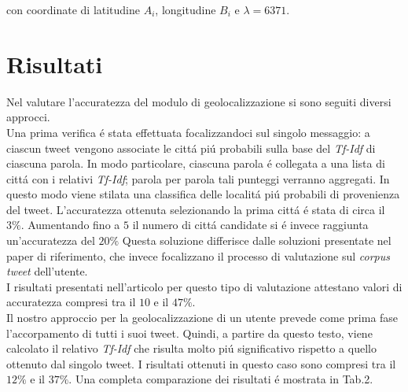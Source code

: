 \documentclass[twocolumn,10pt]{asme2ej}
\begin{document}
con coordinate di latitudine $A_i$, longitudine $B_i$ e $\lambda=6371$. 

\section{Risultati}

Nel valutare l'accuratezza del modulo di geolocalizzazione si sono seguiti diversi approcci. \\Una prima verifica \'e stata effettuata focalizzandoci sul singolo messaggio: a ciascun tweet vengono associate le citt\'a pi\'u probabili sulla base del \textit{Tf-Idf} di ciascuna parola. In modo particolare, ciascuna parola \'e collegata a una lista di citt\'a con i relativi \textit{Tf-Idf}; parola per parola tali punteggi verranno aggregati. In questo modo viene stilata una classifica delle localit\'a pi\'u probabili di provenienza del tweet. L'accuratezza ottenuta selezionando la prima citt\'a \'e stata di circa il $3\%$. Aumentando fino a $5$ il numero di citt\'a candidate si \'e invece raggiunta un'accuratezza del $20\%$ Questa soluzione differisce dalle soluzioni presentate nel paper di riferimento, che invece focalizzano il processo di valutazione sul \textit{corpus tweet} dell'utente. \\I risultati presentati nell'articolo per questo tipo di valutazione attestano   
valori di accuratezza compresi tra il $10$ e il $47\%$.  \\Il nostro approccio per la geolocalizzazione di un utente prevede come prima fase l'accorpamento di tutti i suoi tweet. Quindi, a partire da questo testo, viene calcolato il relativo \textit{Tf-Idf} che risulta molto pi\'u significativo rispetto a quello ottenuto dal singolo tweet. I risultati ottenuti in questo caso sono compresi tra il $12\%$ e il $37\%$. Una completa comparazione dei risultati \'e mostrata in Tab.2.
\end{document}
